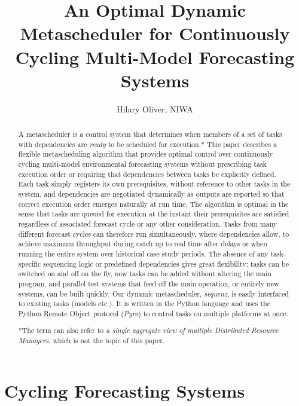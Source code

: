 \documentclass[11pt,a4paper]{article}
\title{An Optimal Dynamic Metascheduler for Continuously Cycling
Multi-Model Forecasting Systems}
\author{Hilary Oliver, NIWA}
\begin{document}
\maketitle

\begin{abstract} A metascheduler is a control system that determines
    when members of a set of tasks with dependencies are {\em ready} to
    be scheduled for execution.* This paper describes a flexible
    metascheduling algorithm that provides optimal control over
    continuously cycling multi-model environmental forecasting systems
    without prescribing task execution order or requiring that
    dependencies between tasks be explicitly defined. Each task simply
    registers its own prerequisites, without reference to other tasks in
    the system, and dependencies are negotiated dynamically as outputs
    are reported so that correct execution order emerges naturally at
    run time.  The algorithm is optimal in the sense that tasks are
    queued for execution at the instant their prerequisites are
    satisfied regardless of associated forecast cycle or any other
    consideration. Tasks from many different forecast cycles can
    therefore run simultaneously, where dependencies allow, to achieve
    maximum throughput during catch up to real time after delays or when
    running the entire system over historical case study periods. The
    absence of any task-specific sequencing logic or predefined
    dependencies gives great flexibility: tasks can be switched on and
    off on the fly, new tasks can be added without altering the main
    program, and parallel test systems that feed off the main operation,
    or entirely new systems, can be built quickly.  Our dynamic
    metascheduler, {\em sequenz}, is easily interfaced to existing tasks
    (models etc.). It is written in the Python language and uses the
    Python Remote Object protocol ({\em Pyro}) to control tasks on
    multiple platforms at once. 

*The term can also refer to {\it a single aggregate view of multiple
Distributed Resource Managers}, which is not the topic of this paper.

\end{abstract}

\pagebreak
\tableofcontents
\pagebreak

\section{Cycling Forecasting Systems}
\end{document}
